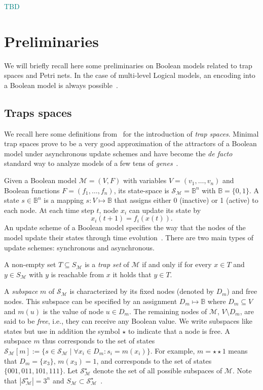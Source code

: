 \documentclass[runningheads]{llncs}
\newcommand{\sylvain}[1]{\textcolor{teal}{#1}}
\begin{document}
\sylvain{TBD}

\section{Preliminaries}

We will briefly recall here some preliminaries on Boolean models related to trap spaces and Petri nets.
In the case of multi-level Logical models, an encoding into a Boolean model is always possible~\cite{Didier2011}.

\subsection{Traps spaces}

We recall here some definitions from~\cite{klarner2015computing} for the introduction of \emph{trap spaces}.
Minimal trap spaces prove to be a very good approximation of the attractors of a Boolean model under asynchronous update schemes and have become the \emph{de facto} standard way to analyze models of a few tens of \emph{genes}~\cite{klarner2017pyboolnet,cifuentes2020control}.

Given a Boolean model \(\mathcal{M} = (V, F)\) with variables \(V=(v_{1},\dots,v_{n})\) and Boolean functions \(F=(f_{1},\dots,f_{n})\), its state-space is \(\mathcal{S}_{\mathcal{M}} =\mathbb{B}^{n}\) with \(\mathbb{B} = \{0, 1\}\). A state \(s \in \mathbb{B}^{n}\) is a mapping \(s : V \mapsto \mathbb{B}\) that assigns either 0 (inactive) or 1 (active) to each node. At each time step \(t\), node \(x_i\) can update its state by
\[x_i(t + 1) = f_i(x(t)).\] An update scheme of a Boolean model specifies the way that the nodes of the model update their states through time evolution~\cite{thomas1991regulatory}. There are two main types of update schemes: synchronous and asynchronous.

A non-empty set \(T \subseteq S_{\mathcal{M}}\) is a \emph{trap set} of \(\mathcal{M}\) if and only if for every \(x \in T\) and \(y \in S_{\mathcal{M}}\) with \(y\) is reachable from \(x\) it holds that \(y \in T\).

A \emph{subspace} \(m\) of \(\mathcal{S}_{\mathcal{M}}\) is characterized by its fixed nodes (denoted by \(D_m\)) and free nodes.
This subspace can be specified by an assignment \(D_m \mapsto \mathbb{B}\) where \(D_m \subseteq V\) and \(m(u)\) is the value of node \(u \in D_m\).
The remaining nodes of \(\mathcal{M}\), \(V \setminus D_m\), are said to be \emph{free}, i.e., they can receive any Boolean value.
We write subspaces like states but use in addition the symbol \(\star\) to indicate that a node is free.
A subspace \(m\) thus corresponds to the set of states \(\mathcal{S}_{\mathcal{M}}[m] := \{s \in \mathcal{S}_{\mathcal{M}}\;|\;\forall x_i \in D_m : s_i = m(x_i)\}\).
For example, \(m = \star\star1\) means that \(D_m = \{x_3\}\), \(m(x_3) = 1\), and corresponds to the set of states \(\{001, 011, 101, 111\}\).
Let \(\mathcal{S}_{\mathcal{M}}^{\star}\) denote the set of all possible subspaces of \(\mathcal{M}\). Note that \(\left|\mathcal{S}_{\mathcal{M}}^{\star}\right| = 3^n\) and \(S_{\mathcal{M}} \subset \mathcal{S}_{\mathcal{M}}^{\star}\)~\cite{klarner2015computing}.
\end{document}
